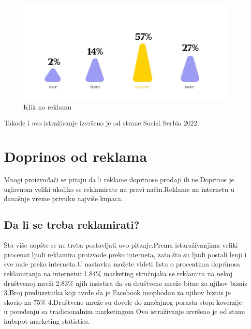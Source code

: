 \documentclass[a4paper]{article}
\begin{document}
{{			
			\begin{figure}[h!]
				\begin{center}
					\includegraphics[scale=0.55]{klik_na_reklamu.jpg}
				\end{center}
				\caption{Klik na reklamu}
				\label{fig:klik_na_reklamu}
			\end{figure}
			Takođe i ovo istraživanje izvršeno je od strane Social Serbia 2022.
			\section{Doprinos od reklama}
			\label{sec:doprinos}
			Mnogi proizvođači se pitaju da li reklame doprinose prodaji ili ne.Doprinos je uglavnom veliki ukoliko se reklamirate na pravi način.Reklame na internetu u današnje vreme privuku najviše kupaca.
			\subsection{Da li se treba reklamirati?}
			\label{subsec:potrebna_reklama}
			Šta više uopšte se ne treba postavljati ovo pitanje.Prema istaraživanjima veliki procenat ljudi reklamira proizvode preko interneta, zato što su ljudi postali lenji i sve rade preko interneta.U nastavku možete videti listu o procentima doprinosa reklamiranja na internetu:
			1.84\% marketing stručnjaka se reklamira na nekoj društvenoj mreži
			2.83\% njih insistira da su društvene mreže bitne za njihov biznis
			3.Broj preduzetnika koji tvrde da je Facebook neophodan za njihov biznis je skocio na 75\%
			4.Društvene mreže su dovele do značajnog porasta stopi koverzije u poređenju sa tradicionalnim marketingom 
			Ovo istraživanje izvršeno je od stane hubspot marketing statistics.
			
			
			\appendix
			

			
}}
\end{document}
